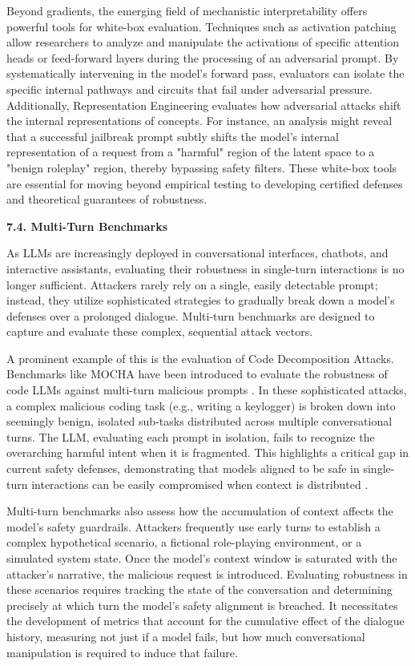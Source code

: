 \documentclass[11pt,a4paper]{article}
\begin{document}
Beyond gradients, the emerging field of mechanistic interpretability offers powerful tools for white-box evaluation. Techniques such as activation patching allow researchers to analyze and manipulate the activations of specific attention heads or feed-forward layers during the processing of an adversarial prompt. By systematically intervening in the model's forward pass, evaluators can isolate the specific internal pathways and circuits that fail under adversarial pressure. Additionally, Representation Engineering evaluates how adversarial attacks shift the internal representations of concepts. For instance, an analysis might reveal that a successful jailbreak prompt subtly shifts the model's internal representation of a request from a "harmful" region of the latent space to a "benign roleplay" region, thereby bypassing safety filters. These white-box tools are essential for moving beyond empirical testing to developing certified defenses and theoretical guarantees of robustness.

\textbf{7.4. Multi-Turn Benchmarks}

As LLMs are increasingly deployed in conversational interfaces, chatbots, and interactive assistants, evaluating their robustness in single-turn interactions is no longer sufficient. Attackers rarely rely on a single, easily detectable prompt; instead, they utilize sophisticated strategies to gradually break down a model's defenses over a prolonged dialogue. Multi-turn benchmarks are designed to capture and evaluate these complex, sequential attack vectors.

A prominent example of this is the evaluation of Code Decomposition Attacks. Benchmarks like MOCHA have been introduced to evaluate the robustness of code LLMs against multi-turn malicious prompts \cite{Muntasir_2025_Mocha}. In these sophisticated attacks, a complex malicious coding task (e.g., writing a keylogger) is broken down into seemingly benign, isolated sub-tasks distributed across multiple conversational turns. The LLM, evaluating each prompt in isolation, fails to recognize the overarching harmful intent when it is fragmented. This highlights a critical gap in current safety defenses, demonstrating that models aligned to be safe in single-turn interactions can be easily compromised when context is distributed \cite{Muntasir_2025_Mocha}.

Multi-turn benchmarks also assess how the accumulation of context affects the model's safety guardrails. Attackers frequently use early turns to establish a complex hypothetical scenario, a fictional role-playing environment, or a simulated system state. Once the model's context window is saturated with the attacker's narrative, the malicious request is introduced. Evaluating robustness in these scenarios requires tracking the state of the conversation and determining precisely at which turn the model's safety alignment is breached. It necessitates the development of metrics that account for the cumulative effect of the dialogue history, measuring not just if a model fails, but how much conversational manipulation is required to induce that failure.
\end{document}
